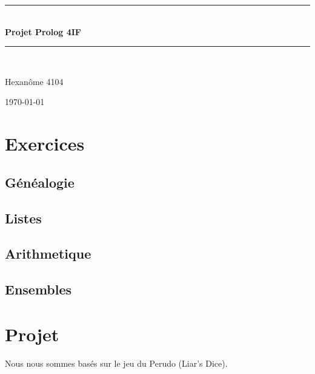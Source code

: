\documentclass{article}
\newcommand{\HRule}{\rule{\linewidth}{0.5mm}}
\begin{document}
\begin{titlepage}
\begin{center}

\HRule \\[0.4cm]
{\huge \bfseries Projet Prolog 4IF}
\HRule \\[1.5cm]

\begin{minipage}{0.8\textwidth}
\center
\large
Hexanôme 4104
\end{minipage}

\vfill

{\large \today}

\end{center}
\end{titlepage}

\section{Exercices}

\subsection{Généalogie}




\subsection{Listes}



\subsection{Arithmetique}



\subsection{Ensembles}



\section{Projet}

Nous nous sommes basés sur le jeu du Perudo (Liar's Dice).
\end{document}

